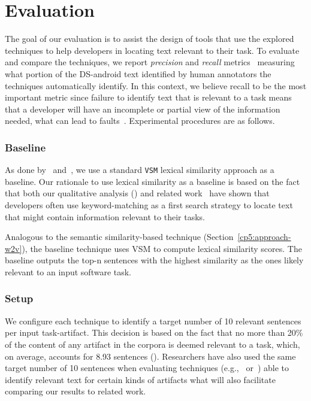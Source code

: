\clearpage

\section{Evaluation}
\label{cp5:evaluation}



The goal of our evaluation is to assist the design of tools that use the explored techniques to help developers in locating text relevant to their task. 
To evaluate and compare the techniques,
we report \textit{precision} and \textit{recall} metrics~\cite{manning2010IR} measuring what portion of the \acs{DS-android} text identified by human annotators the techniques automatically identify.
In this context, we believe recall to be the most important metric since failure to identify text that is relevant to a task means that a developer will have an incomplete or partial view of the information needed,
what can lead to faults~\cite{Murphy2005}.
Experimental procedures are as follows.



\subsubsection{Baseline}


As done by~\cite{Lin2021} and~\cite{Ye2016}, we use a standard \texttt{VSM} lexical similarity approach as a baseline. Our rationale to use 
lexical similarity as a baseline is based on the fact that 
both our qualitative analysis () and
related work~\cite{Ko2006a, Freund2015} have shown that developers often use keyword-matching as a first search strategy to locate text that might contain information relevant to their tasks.


Analogous to the semantic similarity-based technique (Section~\ref{cp5:approach-w2v}), the baseline technique uses VSM to compute lexical similarity scores. The baseline outputs the top-n sentences with the highest similarity as the ones likely relevant to an input software task.




\subsubsection{Setup}



We configure each technique to identify a target number of 10 relevant sentences per input task-artifact.
This decision is based on the fact that no more than 20\% of the content of any artifact in the corpora is deemed relevant to a task, which, on average, accounts for 8.93 sentences ().
Researchers have also used the same target number of 10 sentences when evaluating techniques  (e.g.,~\cite{Xu2017} or~\cite{Lotufo2012}) able to identify relevant text for certain kinds of artifacts what will also facilitate comparing our results to related work.


